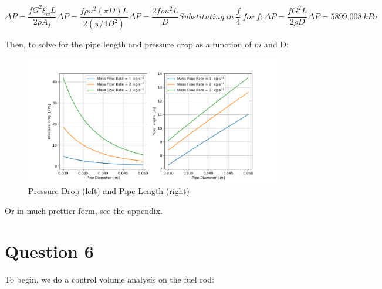 \documentclass{article}
\begin{document}
\begin{subequations}
    \begin{equation}
        \Delta P = \frac{fG^2\xi_w L}{2\rho A_f}
    \end{equation}
    \begin{equation}
        \Delta P = \frac{f \rho u^2  (\pi D) L}{2 (\pi /4 D^2)}
    \end{equation}
    \begin{equation}
        \Delta P = \frac{2 f \rho u^2 L}{D}
    \end{equation}
    \begin{equation*}
        Substituting\ in\ \frac{f}{4}\ for\ f:
    \end{equation*}
    \begin{equation}
        \Delta P = \frac{f G^2 L }{2\rho D}
    \end{equation}
    \begin{equation}
        \boxed{\Delta P = 5899.008\ kPa}
    \end{equation}
\end{subequations}



Then, to solve for the pipe length and pressure drop as a function of $\Dot{m}$ and D:

\begin{figure}[!hp!]
    \centering
    \includegraphics[width=\linewidth]{simple.png}
    \caption{Pressure Drop (left) and Pipe Length (right)}
    \label{fig:enter-label}
\end{figure}

Or in much prettier form, see the \href{appendix}{appendix}.
\newpage
\section{Question 6}
To begin, we do a control volume analysis on the fuel rod:
\end{document}
